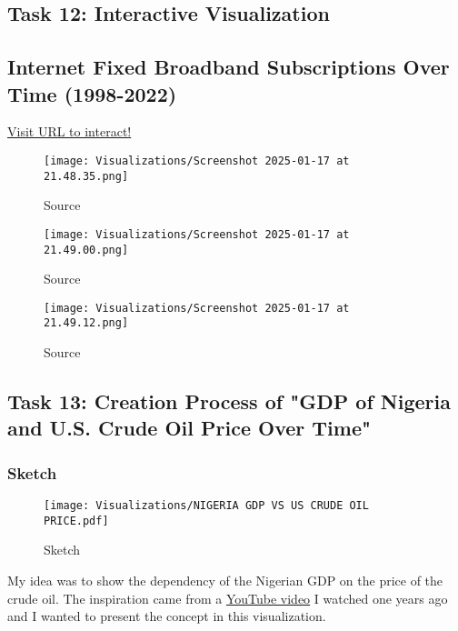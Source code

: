 \documentclass[a4paper,landscape]{article}
\begin{document}
\subsection{Task 12: Interactive Visualization}
\subsection{Internet Fixed Broadband Subscriptions Over Time (1998-2022)}
\href{https://interactive-visualization.vercel.app/}{Visit URL to interact!}

\begin{figure}[H]
    \centering
    \texttt{[image: Visualizations/Screenshot 2025-01-17 at 21.48.35.png]} %
    \caption{Source \cite{ourworldinternet2025}}
    \label{fig:interactive1}
\end{figure}
\begin{figure}[H]
    \centering
    \texttt{[image: Visualizations/Screenshot 2025-01-17 at 21.49.00.png]} %
    \caption{Source \cite{ourworldinternet2025}}
    \label{fig:interactive2}
\end{figure}
\begin{figure}[H]
    \centering
    \texttt{[image: Visualizations/Screenshot 2025-01-17 at 21.49.12.png]} %
    \caption{Source \cite{ourworldinternet2025}}
    \label{fig:interactive3}
\end{figure}

\subsection{Task 13: Creation Process of "GDP of Nigeria and U.S. Crude Oil Price Over Time"}
\subsubsection{Sketch}
\begin{figure}[H]
    \centering
    \texttt{[image: Visualizations/NIGERIA GDP VS US CRUDE OIL PRICE.pdf]} %
    \caption{Sketch}
    \label{fig:sketch}
\end{figure}
My idea was to show the dependency of the Nigerian GDP on the price of the crude oil. The inspiration came from a \href{https://www.youtube.com/watch?v=SnqLPSCWads}{YouTube video} I watched one years ago and I wanted to present the concept in this visualization.
\end{document}
